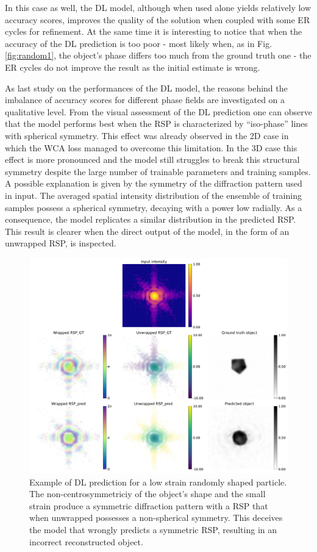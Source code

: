 In this case as well, the DL model, although when used alone yields relatively low accuracy scores, improves the quality of the 
solution when coupled with some ER cycles for refinement. At the same time it is interesting to notice that when the 
accuracy of the DL prediction is too poor - most likely when, as in Fig.\ref{fig:random1}, the object's phase differs too 
much from the ground truth one - the ER cycles do not improve the result as the initial estimate is wrong. 

As last study on the performances of the DL model, the reasons behind the imbalance of accuracy scores for different phase 
fields are investigated on a qualitative level. From the visual assessment of the DL prediction one can observe that 
the model performs best when the RSP is characterized by ``iso-phase'' lines with spherical symmetry. This effect was 
already observed in the 2D case in which the WCA loss managed to overcome this limitation. In the 3D case this effect is 
more pronounced and the model still struggles to break this structural symmetry despite the large number of trainable parameters 
and training samples. A possible explanation is given by the symmetry of the diffraction pattern used in input. The averaged 
spatial intensity distribution of the ensemble of training samples possess a spherical symmetry, decaying with a power 
low radially. As a consequence, the model replicates a similar distribution in the predicted RSP. This result is clearer 
when the direct output of the model, in the form of an unwrapped RSP, is inspected. 

\begin{figure}[H]
    \centering
    \includegraphics[width=\textwidth]{figures/Phasing/non_centrosymmetric_study_3d_random_LS0.pdf}
    \caption{Example of DL prediction for a low strain randomly shaped particle. The non-centrosymmetriciy of the object's 
    shape and the small strain produce a symmetric diffraction pattern with a RSP that when unwrapped possesses a non-spherical 
    symmetry. This deceives the model that wrongly predicts a symmetric RSP, resulting in an incorrect reconstructed object. }
    \label{fig:non_centrosymm_LS}
\end{figure}

